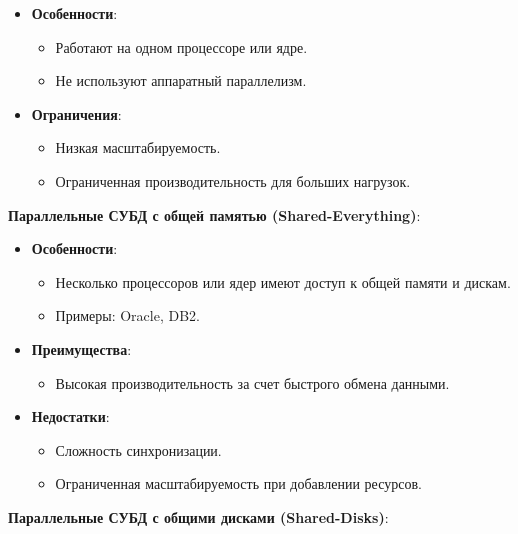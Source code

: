 \documentclass[a4paper,12pt]{article}
\begin{document}
\begin{itemize}
    \item \textbf{Особенности}:
    \begin{itemize}
        \item Работают на одном процессоре или ядре.
        \item Не используют аппаратный параллелизм.
    \end{itemize}
    \item \textbf{Ограничения}:
    \begin{itemize}
        \item Низкая масштабируемость.
        \item Ограниченная производительность для больших нагрузок.
    \end{itemize}
\end{itemize}

\textbf{Параллельные СУБД с общей памятью (Shared-Everything)}:

\begin{itemize}
    \item \textbf{Особенности}:
    \begin{itemize}
        \item Несколько процессоров или ядер имеют доступ к общей памяти и дискам.
        \item Примеры: Oracle, DB2.
    \end{itemize}
    \item \textbf{Преимущества}:
    \begin{itemize}
        \item Высокая производительность за счет быстрого обмена данными.
    \end{itemize}
    \item \textbf{Недостатки}:
    \begin{itemize}
        \item Сложность синхронизации.
        \item Ограниченная масштабируемость при добавлении ресурсов.
    \end{itemize}
\end{itemize}

\textbf{Параллельные СУБД с общими дисками (Shared-Disks)}:
\end{document}
